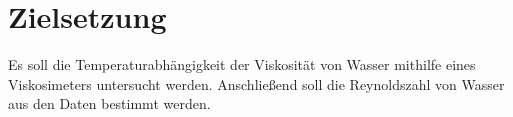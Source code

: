 
\section{Zielsetzung}
\label{sec:Zielsetzung}
 Es soll die Temperaturabhängigkeit der Viskosität von Wasser mithilfe eines
 Viskosimeters untersucht werden. Anschließend soll die Reynoldszahl von Wasser
 aus den Daten bestimmt werden.
